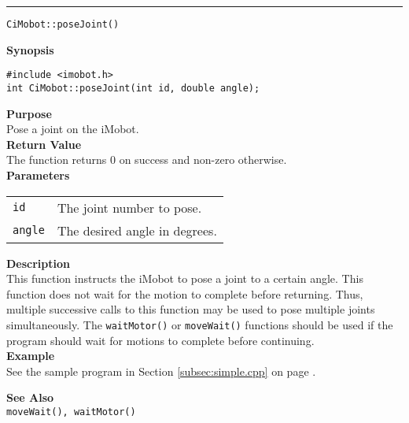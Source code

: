 \noindent
\vspace{5pt}
\rule{6.5in}{0.015in}
\noindent
{\LARGE \texttt{CiMobot::poseJoint()}}\\
{}

\noindent
{\bf Synopsis}\\
\begin{verbatim}
#include <imobot.h>
int CiMobot::poseJoint(int id, double angle);
\end{verbatim}

\noindent
{\bf Purpose}\\
Pose a joint on the iMobot.\\

\noindent
{\bf Return Value}\\
The function returns 0 on success and non-zero otherwise.\\

\noindent
{\bf Parameters}
\vspace{-0.1in}
\begin{description}
\item               
\begin{tabular}{p{10 mm}p{145 mm}}
\texttt{id} & The joint number to pose. \\
\texttt{angle} & The desired angle in degrees.
\end{tabular}
\end{description}

\noindent
{\bf Description}\\
This function instructs the iMobot to pose a joint to a certain angle. This
function does not wait for the motion to complete before returning. Thus,
multiple successive calls to this function may be used to pose multiple joints
simultaneously. The \texttt{waitMotor()} or \texttt{moveWait()} functions should
be used if the program should wait for motions to complete before continuing. \\

\noindent
{\bf Example}\\
See the sample program in Section \ref{subsec:simple.cpp} on page \pageref{subsec:simple.cpp}.
\noindent

\noindent
{\bf See Also}\\
\texttt{moveWait(), waitMotor()}

